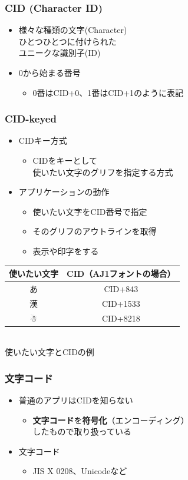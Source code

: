\begin{frame}\frametitle{CID (Character ID)}
  \begin{itemize}
  \item 様々な種類の文字(Character)\\
    ひとつひとつに付けられた\\
    ユニークな識別子(ID)
  \item 0から始まる番号
    \begin{itemize}
    \item 0番はCID+0、1番はCID+1のように表記
    \end{itemize}
  \end{itemize}
\end{frame}

\begin{frame}\frametitle{CID-keyed}
  \begin{itemize}
  \item CIDキー方式
    \begin{itemize}
    \item CIDをキーとして\\
      使いたい文字のグリフを指定する方式
    \end{itemize}
  \item アプリケーションの動作
    \begin{itemize}
    \item 使いたい文字をCID番号で指定
    \item そのグリフのアウトラインを取得
    \item 表示や印字をする
    \end{itemize}
  \end{itemize}

  \begin{center}
    \footnotesize
    \begin{tabular}{c|c}
      使いたい文字 & CID（AJ1フォントの場合） \\
      \hline
      あ & CID+843 \\
      漢 & CID+1533 \\
      ☃ & CID+8218
    \end{tabular} \\
    使いたい文字とCIDの例
  \end{center}
\end{frame}

\begin{frame}\frametitle{文字コード}
  \begin{itemize}
  \item 普通のアプリはCIDを知らない
    \begin{itemize}
    \item \textbf{文字コード}を\textbf{符号化}（エンコーディング）\\
      したもので取り扱っている
    \end{itemize}
  \item 文字コード
    \begin{itemize}
    \item JIS X 0208、Unicodeなど
    \end{itemize}
  \end{itemize}
\end{frame}
      
